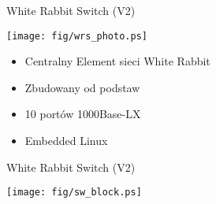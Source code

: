 \documentclass[compress,red]{beamer}
\begin{document}
\begin{frame}{White Rabbit Switch (V2)}

    \begin{center}
    \texttt{[image: fig/wrs\_photo.ps]}
    \end{center}

	\begin{itemize}
	\item Centralny Element sieci White Rabbit
	\item Zbudowany od podstaw
	\item 10 portów 1000Base-LX 
	\item Embedded Linux
	\end{itemize}
\end{frame}
\begin{frame}{White Rabbit Switch (V2)}

    \begin{center}
    \texttt{[image: fig/sw\_block.ps]}
    \end{center}


\end{frame}
\end{document}
